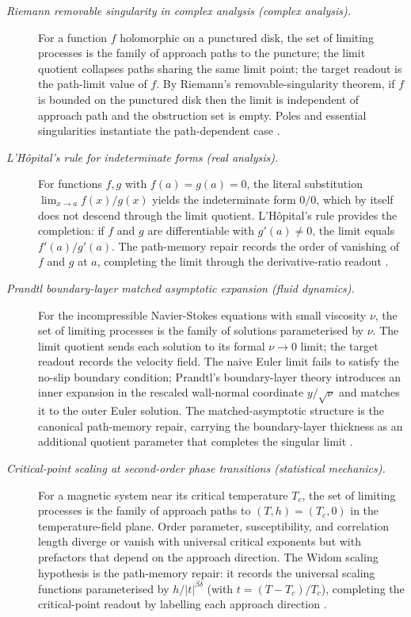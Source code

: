 \documentclass[11pt]{article}
\theoremstyle{definition}
\begin{document}
\begin{description}
\item[\emph{Riemann removable singularity in complex
analysis (complex analysis).}]
For a function \(f\) holomorphic on a punctured disk,
the set of limiting processes is the family of
approach paths to the puncture; the limit quotient
collapses paths sharing the same limit point; the
target readout is the path-limit value of \(f\).  By
Riemann's removable-singularity theorem, if \(f\) is
bounded on the punctured disk then the limit is
independent of approach path and the obstruction set
is empty.  Poles and essential singularities
instantiate the path-dependent case
\citep{Ahlfors1979ComplexAnalysis}.

\item[\emph{L'H\^opital's rule for indeterminate
forms (real analysis).}]
For functions \(f,g\) with \(f(a)=g(a)=0\), the
literal substitution \(\lim_{x\to a}f(x)/g(x)\)
yields the indeterminate form \(0/0\), which by
itself does not descend through the limit quotient.
L'H\^opital's rule provides the completion: if \(f\)
and \(g\) are differentiable with \(g'(a)\ne 0\),
the limit equals \(f'(a)/g'(a)\).  The path-memory
repair records the order of vanishing of \(f\) and
\(g\) at \(a\), completing the limit through the
derivative-ratio readout
\citep{Cauchy1821CoursAnalyse}.

\item[\emph{Prandtl boundary-layer matched asymptotic
expansion (fluid dynamics).}]
For the incompressible Navier-Stokes equations with
small viscosity \(\nu\), the set of limiting
processes is the family of solutions parameterised by
\(\nu\).  The limit quotient sends each solution to
its formal \(\nu\to 0\) limit; the target readout
records the velocity field.  The naive Euler limit
fails to satisfy the no-slip boundary condition;
Prandtl's boundary-layer theory introduces an inner
expansion in the rescaled wall-normal coordinate
\(y/\sqrt{\nu}\) and matches it to the outer Euler
solution.  The matched-asymptotic structure is the
canonical path-memory repair, carrying the
boundary-layer thickness as an additional quotient
parameter that completes the singular limit
\citep{Prandtl1904BoundaryLayer}.

\item[\emph{Critical-point scaling at second-order
phase transitions (statistical mechanics).}]
For a magnetic system near its critical temperature
\(T_c\), the set of limiting processes is the family
of approach paths to \((T,h)=(T_c,0)\) in the
temperature-field plane.  Order parameter,
susceptibility, and correlation length diverge or
vanish with universal critical exponents but with
prefactors that depend on the approach direction.
The Widom scaling hypothesis is the path-memory
repair: it records the universal scaling functions
parameterised by \(h/|t|^{\beta\delta}\) (with
\(t=(T-T_c)/T_c\)), completing the critical-point
readout by labelling each approach direction
\citep{Stanley1971PhaseTransitions}.


\end{description}
\end{document}
